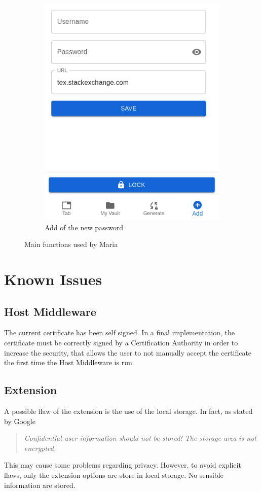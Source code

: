 \begin{enumerate}
\begin{figure}[H]
\begin{subfigure}{.5\textwidth}
			\includegraphics[width=.6\linewidth]{images/extension/add.png}
			\caption{Add of the new password}
			\label{fig:sub22}
		\end{subfigure}
		\caption{Main functions used by Maria}
		\label{fig:tes2t}
	\end{figure}
\end{enumerate}


\section{Known Issues}
\label{sec:know_issues}

\subsection{Host Middleware}
The current certificate has been self signed. In a final implementation, the certificate must be correctly signed by a Certification Authority in order to increase the security, that allows the user to not manually accept the certificate the first time the Host Middleware is run.


\subsection{Extension}
\label{sec:extension}
A possible flaw of the extension is the use of the local storage. In fact, as stated by Google
\begin{quote}
    \textit{    Confidential user information should not be stored! The storage area is not encrypted.
    }
\end{quote}
This may cause some problems regarding privacy. However, to avoid explicit flaws, only the extension options are store in local storage. No sensible information are stored.
